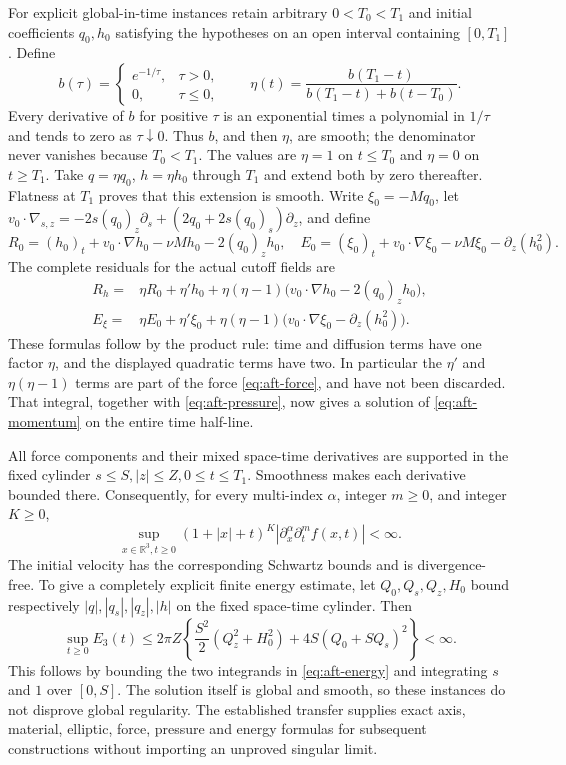 For explicit global-in-time instances retain arbitrary \(0<T_0<T_1\)
and initial coefficients \(q_0,h_0\) satisfying the hypotheses on an
open interval containing \([0,T_1]\).  Define
\[
 b(\tau)=\begin{cases}e^{-1/\tau},&\tau>0,\\0,&\tau\leq0,\end{cases}
 \qquad
 \eta(t)=\frac{b(T_1-t)}{b(T_1-t)+b(t-T_0)}.
\]
Every derivative of \(b\) for positive \(\tau\) is an exponential
times a polynomial in \(1/\tau\) and tends to zero as \(\tau\downarrow0\).
Thus \(b\), and then \(\eta\), are smooth; the denominator never
vanishes because \(T_0<T_1\).  The values are \(\eta=1\) on
\(t\leq T_0\) and \(\eta=0\) on \(t\geq T_1\).
Take \(q=\eta q_0\), \(h=\eta h_0\) through \(T_1\) and extend
both by zero thereafter.  Flatness at \(T_1\) proves that this extension
is smooth.  Write \(\xi_0=-Mq_0\), let
\(v_0\cdot\nabla_{s,z}=-2s(q_0)_z\partial_s
 +(2q_0+2s(q_0)_s)\partial_z\), and define
\[
 R_0=(h_0)_t+v_0\cdot\nabla h_0-\nu Mh_0-2(q_0)_zh_0,
 \quad
 E_0=(\xi_0)_t+v_0\cdot\nabla\xi_0-\nu M\xi_0-\partial_z(h_0^2).
\]
The complete residuals for the actual cutoff fields are
\begin{equation}\label{eq:aft-time-cutoff}
 \begin{split}
 R_h={}&\eta R_0+\eta'h_0
   +\eta(\eta-1)\bigl(v_0\cdot\nabla h_0-2(q_0)_zh_0\bigr),\\
 E_\xi={}&\eta E_0+\eta'\xi_0
   +\eta(\eta-1)\bigl(v_0\cdot\nabla\xi_0-\partial_z(h_0^2)\bigr).
 \end{split}
\end{equation}
These formulas follow by the product rule: time and diffusion terms
have one factor \(\eta\), and the displayed quadratic terms have
two.  In particular the \(\eta'\) and \(\eta(\eta-1)\) terms are
part of the force \eqref{eq:aft-force}, and have not been discarded.
That integral, together with \eqref{eq:aft-pressure}, now gives a
solution of \eqref{eq:aft-momentum} on the entire time half-line.

All force components and their mixed space-time derivatives are supported
in the fixed cylinder \(s\leq S, |z|\leq Z, 0\leq t\leq T_1\).
Smoothness makes each derivative bounded there.  Consequently, for every
multi-index \(\alpha\), integer \(m\geq0\), and integer \(K\geq0\),
\[
 \sup_{x\in\mathbb R^3,t\geq0}
 (1+|x|+t)^K|\partial_x^\alpha\partial_t^m f(x,t)|<\infty.
\]
The initial velocity has the corresponding Schwartz bounds and is
divergence-free.  To give a completely explicit finite energy estimate,
let \(Q_0,Q_s,Q_z,H_0\) bound respectively
\(|q|,|q_s|,|q_z|,|h|\) on the fixed space-time cylinder.  Then
\begin{equation}\label{eq:aft-uniform-energy-bound}
 \sup_{t\geq0}E_3(t)
 \leq2\pi Z\left\{\frac{S^2}{2}(Q_z^2+H_0^2)
                 +4S(Q_0+S Q_s)^2\right\}<\infty.
\end{equation}
This follows by bounding the two integrands in \eqref{eq:aft-energy}
and integrating \(s\) and \(1\) over \([0,S]\).  The solution itself
is global and smooth, so these instances do not disprove global
regularity.  The established transfer supplies exact axis, material,
elliptic, force, pressure and energy formulas for subsequent constructions
without importing an unproved singular limit.
